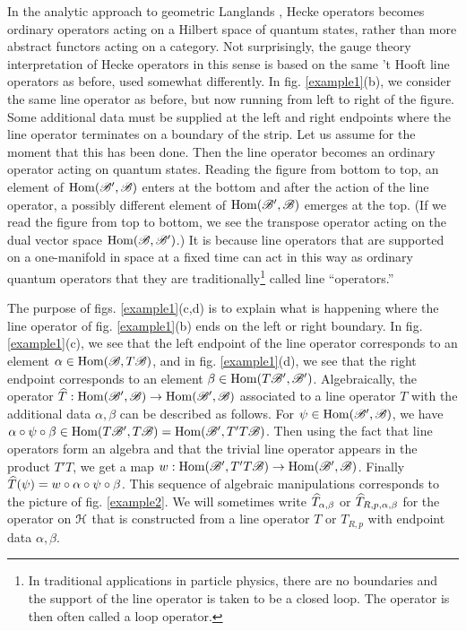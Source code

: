 \documentclass[11pt,a4paper]{article}
\begin{document}
In the analytic approach to geometric Langlands \cite{EFK,EFK2}, Hecke operators becomes ordinary operators acting on a Hilbert space of quantum states,
rather than more abstract functors acting on a category.   Not surprisingly, the gauge theory interpretation of Hecke operators in this sense is based on the
 same 't Hooft line operators as before, used somewhat differently.   In fig. \ref{example1}(b), we consider the same line operator as before, but now
running from left to right of the figure.   Some additional data must be supplied at the left and right endpoints where the line operator terminates on a
boundary of the strip.   Let us assume for the moment that this has been done.   Then the line operator becomes an ordinary operator acting on quantum states.
Reading the figure from bottom to top, an element of ${\mathrm{Hom}}({\mathscr B}',{\mathscr B})$ enters at the bottom and after the action of the line operator, a possibly different
element of ${\mathrm{Hom}}({\mathscr B}',{\mathscr B})$ emerges at the top.   (If we read the figure from top to bottom, we see the transpose operator acting on the dual
vector space ${\mathrm{Hom}}({\mathscr B},{\mathscr B}')$.)    It is because line operators that are supported on a one-manifold in space at a fixed time 
can act  in this way as ordinary quantum operators that they are traditionally\footnote{In traditional applications in particle physics, there
are no boundaries and the support of the line operator is taken to be a closed loop.   The operator is then often called a loop operator.} called
line ``operators.'' 



The purpose of figs. \ref{example1}(c,d) is to explain what is happening where the line operator of fig. \ref{example1}(b) ends on the left or right boundary.
In fig. \ref{example1}(c), we see that the left endpoint of the line operator corresponds to an element  $\alpha\in{\mathrm{Hom}}({\mathscr B},T{\mathscr B})$, and in fig.
\ref{example1}(d), we see that the right endpoint corresponds to an element $\beta\in {\mathrm{Hom}}(T{\mathscr B}',{\mathscr B}')$.   Algebraically, the operator
$\widehat T:{\mathrm{Hom}}({\mathscr B}',{\mathscr B})\to {\mathrm{Hom}}({\mathscr B}',{\mathscr B})$ associated to a line operator $T$ with the additional data $\alpha,\beta$ can be described as follows.   For $\psi\in {\mathrm{Hom}}({\mathscr B}',{\mathscr B})$,
we have $\alpha\circ\psi\circ\beta\in {\mathrm{Hom}}(T{\mathscr B}',T{\mathscr B})={\mathrm{Hom}}({\mathscr B}',T'T{\mathscr B})$. Then using the fact that line operators
form an algebra and that the trivial line operator appears in the product $T'T$, we get a map $w:{\mathrm{Hom}}({\mathscr B}',T'T{\mathscr B})\to {\mathrm{Hom}}({\mathscr B}' ,{\mathscr B})$.  Finally
$\widehat T(\psi)=w\circ\alpha\circ\psi\circ\beta$.   This sequence of algebraic manipulations corresponds to the picture of fig. \ref{example2}.  
We will sometimes write $\widehat T_{\alpha,\beta}$ or $\widehat T_{R,p,\alpha,\beta}$  for the operator on ${\mathcal H}$ that is constructed from a line operator $T$ or $T_{R,p}$ with endpoint
data $\alpha,\beta$.  
\end{document}
